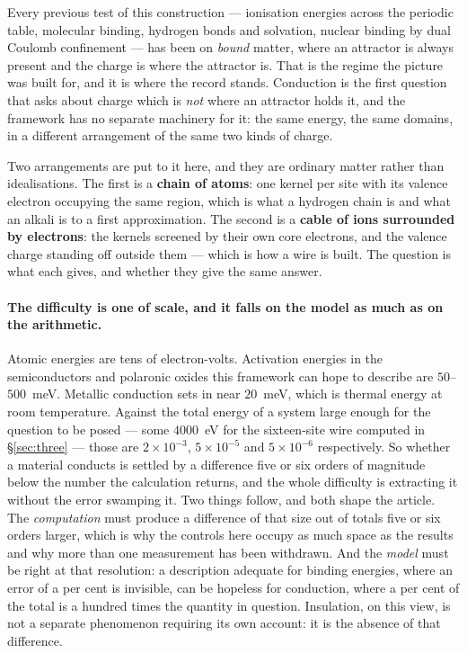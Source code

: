 \documentclass[11pt]{article}
\begin{document}
Every previous test of this construction --- ionisation energies across the periodic table, molecular
binding, hydrogen bonds and solvation, nuclear binding by dual Coulomb confinement
\cite{realnucleus} --- has been on \emph{bound} matter, where an attractor is always present and the
charge is where the attractor is. That is the regime the picture was built for, and it is where the
record stands. Conduction is the first question that asks about charge which is \emph{not} where an
attractor holds it, and the framework has no separate machinery for it: the same energy, the same
domains, in a different arrangement of the same two kinds of charge.

Two arrangements are put to it here, and they are ordinary matter rather than idealisations. The
first is a \textbf{chain of atoms}: one kernel per site with its valence electron occupying the same
region, which is what a hydrogen chain is and what an alkali is to a first approximation. The second
is a \textbf{cable of ions surrounded by electrons}: the kernels screened by their own core
electrons, and the valence charge standing off outside them --- which is how a wire is built. The
question is what each gives, and whether they give the same answer.

\paragraph{The difficulty is one of scale, and it falls on the model as much as on the arithmetic.}
Atomic energies are tens of electron-volts. Activation energies in the semiconductors and polaronic oxides this
framework can hope to describe are $50$--$500$~meV. Metallic conduction sets in near $20$~meV, which
is thermal energy at room temperature. Against the total energy of a system large enough for the
question to be posed --- some $4000$~eV for the sixteen-site wire computed in
\S\ref{sec:three} --- those are $2\times10^{-3}$, $5\times10^{-5}$ and $5\times10^{-6}$
respectively. So whether a material conducts is settled by a difference five or six orders of
magnitude below the number the calculation returns, and the whole difficulty is extracting it
without the error swamping it. Two things follow, and both shape the article. The
\emph{computation} must produce a difference of that size out of totals five or six orders larger,
which is why the controls here occupy as much space as the results and why more than one measurement
has been withdrawn. And the \emph{model} must be right at that resolution: a description adequate for
binding energies, where an error of a per cent is invisible, can be hopeless for conduction, where a
per cent of the total is a hundred times the quantity in question. Insulation, on this
view, is not a separate phenomenon requiring its own account: it is the absence of that difference.
\end{document}
